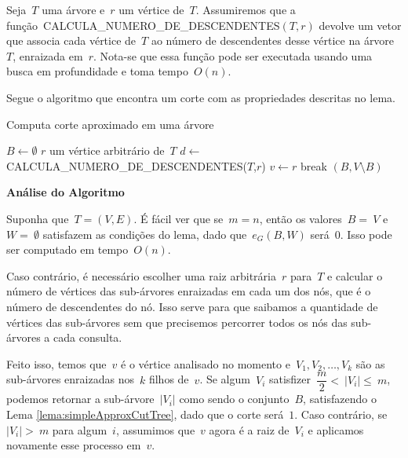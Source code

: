 \documentclass[a4paper,12pt]{article}
\begin{document}
\bigskip

Seja~$T$ uma árvore e~$r$ um vértice de~$T$. 
Assumiremos que
a função~CALCULA\_NUMERO\_DE\_DESCENDENTES$(T,r)$ devolve um vetor
que associa cada vértice de~$T$ ao número de descendentes desse 
vértice na árvore~$T$, enraizada em~$r$. Nota-se que essa função pode
ser executada usando uma busca em profundidade e toma tempo~$O(n)$.


Segue o algoritmo que encontra um corte com as propriedades descritas
no lema.

\medskip

\begin{algorithm}[H]
\label{alg:simpleApproxCutTree}

	\caption{Computa corte aproximado em uma árvore}
	$B \gets \emptyset$\;
	{
		$r$ um vértice arbitrário de~$T$\;
		$d \gets~$ CALCULA\_NUMERO\_DE\_DESCENDENTES($T$,$r$)\;
		$v \gets r$\;
		{
		{
			{
				break\;
			}
		}
		}
	}
	\Return $(B,V\setminus B)$

\end{algorithm}	

\bigskip
\bigskip
\bigskip

\textbf{Análise do Algoritmo}

	Suponha que~$T=(V,E)$.
	É fácil ver que se~$m=n$, então os valores~$B =~V$ e~$W =~\emptyset$ 
	satisfazem as condições do lema, dado que~$e_G(B,W)$ será~$0$. 
	Isso pode ser computado em tempo~$O(n)$.

	Caso contrário, é necessário escolher uma raiz arbitrária~$r$ para~$T$
	e calcular o número de vértices das sub-árvores enraizadas 
	em cada um dos nós, que é o número de descendentes do nó.
	Isso serve para que saibamos a quantidade de vértices das sub-árvores
	sem que precisemos percorrer todos os nós das sub-árvores a cada consulta.

	Feito isso, temos que~$v$ é o vértice analisado no momento 
	e~$V_1, V_2, \ldots, V_k$ são as sub-árvores enraizadas nos~$k$ filhos
	de~$v$.
	Se algum~$V_i$ satisfizer~$\dfrac{m}{2}<~|V_i|\le~m$, podemos retornar
	a sub-árvore~$|V_i|$ como sendo o conjunto~$B$, satisfazendo o Lema 
	\ref{lema:simpleApproxCutTree},
	dado que o corte será~$1$.
	Caso contrário, se~$|V_i|>~m$ para algum~$i$, assumimos que~$v$ 
	agora é a raiz de~$V_i$ e aplicamos novamente esse processo em~$v$.
\end{document}
